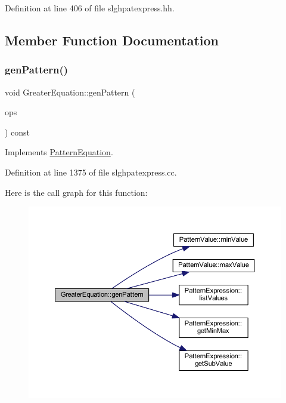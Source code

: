Definition at line 406 of file slghpatexpress.\+hh.



\subsection{Member Function Documentation}
\mbox{\label{class_greater_equation_a4ebd4be45c692f46fdfd252d2c8c3628}} 
\subsubsection{\texorpdfstring{genPattern()}{genPattern()}}
{\footnotesize\ttfamily void Greater\+Equation\+::gen\+Pattern (\begin{DoxyParamCaption}\item[{const vector$<$ \mbox{\hyperlink{class_token_pattern}{Token\+Pattern}} $>$ \&}]{ops }\end{DoxyParamCaption}) const\hspace{0.3cm}{\ttfamily [virtual]}}



Implements \mbox{\hyperlink{class_pattern_equation_a9838e5bfe5b6013c99567628a6364bfd}{Pattern\+Equation}}.



Definition at line 1375 of file slghpatexpress.\+cc.

Here is the call graph for this function\+:
\nopagebreak
\begin{figure}[H]
\begin{center}
\leavevmode
\includegraphics[width=350pt]{class_greater_equation_a4ebd4be45c692f46fdfd252d2c8c3628_cgraph}
\end{center}
\end{figure}


